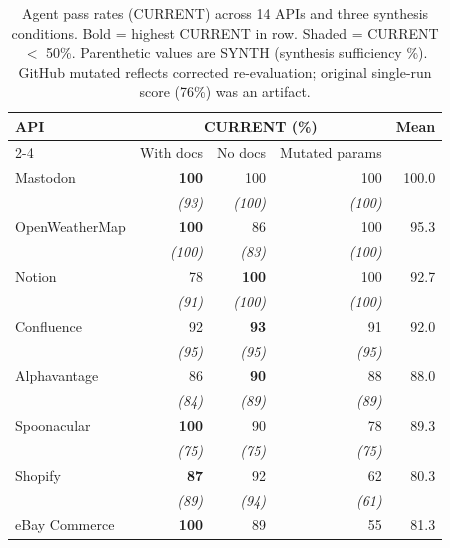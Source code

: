 \begin{table}[htbp]
\centering
\caption{Agent pass rates (CURRENT) across 14 APIs and three synthesis conditions.
Bold = highest CURRENT in row. \colorbox{red!12}{Shaded} = CURRENT $<$ 50\%.
Parenthetic values are SYNTH (synthesis sufficiency \%).
GitHub mutated reflects corrected re-evaluation; original single-run score (76\%) was an artifact.}
\label{tab:main-results}
\small
\begin{tabular}{l rrr r}
\toprule
\multirow{2}{*}{\textbf{API}} &
  \multicolumn{3}{c}{\textbf{CURRENT (\%)}} &
  \multirow{2}{*}{\textbf{Mean}} \\
\cmidrule(lr){2-4}
& With docs & No docs & Mutated params & \\
\midrule
Mastodon        & \textbf{100}    & 100             & 100             & 100.0 \\
                & \textit{(93)}   & \textit{(100)}  & \textit{(100)}  & \\
OpenWeatherMap  & \textbf{100}    & 86              & 100             &  95.3 \\
                & \textit{(100)}  & \textit{(83)}   & \textit{(100)}  & \\
Notion          & 78              & \textbf{100}    & 100             &  92.7 \\
                & \textit{(91)}   & \textit{(100)}  & \textit{(100)}  & \\
Confluence      & 92              & \textbf{93}     & 91              &  92.0 \\
                & \textit{(95)}   & \textit{(95)}   & \textit{(95)}   & \\
Alphavantage    & 86              & \textbf{90}     & 88              &  88.0 \\
                & \textit{(84)}   & \textit{(89)}   & \textit{(89)}   & \\
Spoonacular     & \textbf{100}    & 90              & 78              &  89.3 \\
                & \textit{(75)}   & \textit{(75)}   & \textit{(75)}   & \\
Shopify         & \textbf{87}     & 92              & 62              &  80.3 \\
                & \textit{(89)}   & \textit{(94)}   & \textit{(61)}   & \\
eBay Commerce   & \textbf{100}    & 89              & \cellcolor{red!12}55 & 81.3 \\

\end{tabular}
\end{table}
